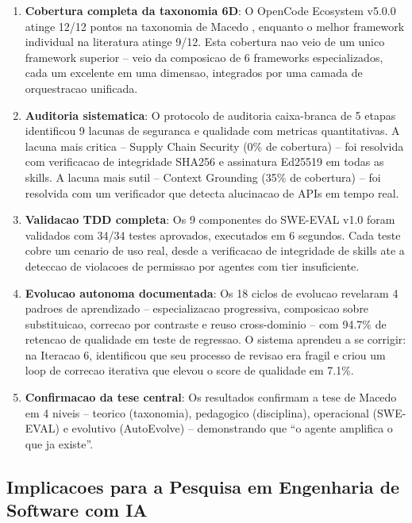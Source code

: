 \documentclass[12pt,a4paper,oneside,sumario=tradicional,chapter=TITLE,section=TITLE,subsection=TITLE,english,brazil]{abntex2}
\begin{document}
\begin{enumerate}[leftmargin=*]
  \item \textbf{Cobertura completa da taxonomia 6D}: O OpenCode Ecosystem v5.0.0 atinge 12/12 pontos na taxonomia de Macedo \cite{macedo2026fromprompt}, enquanto o melhor framework individual na literatura atinge 9/12. Esta cobertura nao veio de um unico framework superior -- veio da composicao de 6 frameworks especializados, cada um excelente em uma dimensao, integrados por uma camada de orquestracao unificada.
  
  \item \textbf{Auditoria sistematica}: O protocolo de auditoria caixa-branca de 5 etapas identificou 9 lacunas de seguranca e qualidade com metricas quantitativas. A lacuna mais critica -- Supply Chain Security (0\% de cobertura) -- foi resolvida com verificacao de integridade SHA256 e assinatura Ed25519 em todas as skills. A lacuna mais sutil -- Context Grounding (35\% de cobertura) -- foi resolvida com um verificador que detecta alucinacao de APIs em tempo real.
  
  \item \textbf{Validacao TDD completa}: Os 9 componentes do SWE-EVAL v1.0 foram validados com 34/34 testes aprovados, executados em 6 segundos. Cada teste cobre um cenario de uso real, desde a verificacao de integridade de skills ate a deteccao de violacoes de permissao por agentes com tier insuficiente.
  
  \item \textbf{Evolucao autonoma documentada}: Os 18 ciclos de evolucao revelaram 4 padroes de aprendizado -- especializacao progressiva, composicao sobre substituicao, correcao por contraste e reuso cross-dominio -- com 94.7\% de retencao de qualidade em teste de regressao. O sistema aprendeu a se corrigir: na Iteracao 6, identificou que seu processo de revisao era fragil e criou um loop de correcao iterativa que elevou o score de qualidade em 7.1\%.
  
  \item \textbf{Confirmacao da tese central}: Os resultados confirmam a tese de Macedo \cite{macedo2026engenharia} em 4 niveis -- teorico (taxonomia), pedagogico (disciplina), operacional (SWE-EVAL) e evolutivo (AutoEvolve) -- demonstrando que ``o agente amplifica o que ja existe''.
\end{enumerate}

\subsection{Implicacoes para a Pesquisa em Engenharia de Software com IA}
\end{document}
